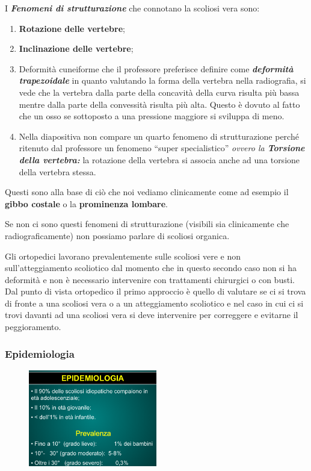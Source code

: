 I \emph{\textbf{Fenomeni di strutturazione}} che connotano la scoliosi
vera sono:

\begin{enumerate}
\def\labelenumi{\arabic{enumi}.}
\item
  \textbf{Rotazione delle vertebre};
\item
  \textbf{Inclinazione delle vertebre};
\item
  Deformità cuneiforme che il professore preferisce definire come
  \emph{\textbf{deformità trapezoidale}} in quanto valutando la forma
  della vertebra nella radiografia, si vede che la vertebra dalla parte
  della concavità della curva risulta più bassa mentre dalla parte della
  convessità risulta più alta. Questo è dovuto al fatto che un osso se
  sottoposto a una pressione maggiore si sviluppa di meno.
\item
  Nella diapositiva non compare un quarto fenomeno di strutturazione
  perché ritenuto dal professore un fenomeno ``super specialistico''
  \emph{ovvero la \textbf{Torsione della vertebra: }}la rotazione della
  vertebra si associa anche ad una torsione della vertebra stessa.
\end{enumerate}

Questi sono alla base di ciò che noi vediamo clinicamente come ad
esempio il \textbf{gibbo costale} o la \textbf{prominenza lombare}.

Se non ci sono questi fenomeni di strutturazione (visibili sia
clinicamente che radiograficamente) non possiamo parlare di scoliosi
organica.

Gli ortopedici lavorano prevalentemente sulle scoliosi vere e non
sull'atteggiamento scoliotico dal momento che in questo secondo caso non
si ha deformità e non è necessario intervenire con trattamenti
chirurgici o con busti. Dal punto di vista ortopedico il primo approccio
è quello di valutare se ci si trova di fronte a una scoliosi vera o a un
atteggiamento scoliotico e nel caso in cui ci si trovi davanti ad una
scoliosi vera si deve intervenire per correggere e evitarne il
peggioramento.

\subsubsection{Epidemiologia}


\begin{figure}[!ht]
\centering
	\includegraphics[width=0.5\textwidth]{012/image6.png}
\end{figure}

